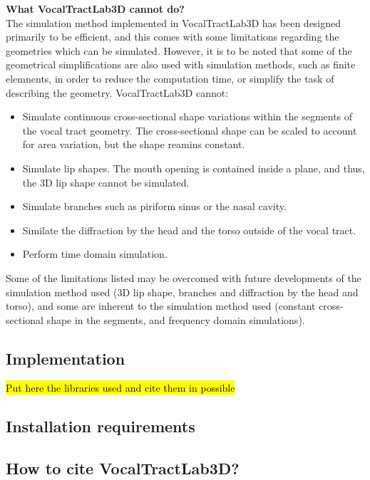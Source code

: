 \documentclass[]{article}
\begin{document}
	\textbf{What VocalTractLab3D cannot do?} \\
	The simulation method implemented in VocalTractLab3D has been 
	designed primarily to be efficient, and this comes with some 
	limitations regarding the geometries which can be simulated.
	However, it is to be noted that some of the geometrical simplifications are also used with simulation methods, such as finite
	elemnents, in order to reduce the computation time, or simplify the task of describing the geometry.
	VocalTractLab3D cannot:
	\begin{itemize}
		\item Simulate continuous cross-sectional shape variations within the segments of the vocal tract geometry. The cross-sectional shape can be scaled to account for area variation, but the shape reamins constant.
		\item Simulate lip shapes. The mouth opening is contained 
		inside a plane, and thus, the 3D lip shape cannot be simulated.
		\item Simulate branches such as piriform sinus or the nasal 
		cavity.
		\item Similate the diffraction by the head and the torso outside
		of the vocal tract.
		\item Perform time domain simulation.
	\end{itemize}
	Some of the limitations listed may be overcomed with future developments of the simulation method used (3D lip shape, branches 
	and diffraction by the head and torso), and some are inherent to 
	the simulation method used (constant cross-sectional shape in the 
	segments, and frequency domain simulations).
	
	\subsection{Implementation}
	
	\hl{Put here the libraries used and cite them in possible}
	
	\subsection{Installation requirements}
	
	\subsection{How to cite VocalTractLab3D?}
	
	
\end{document}
